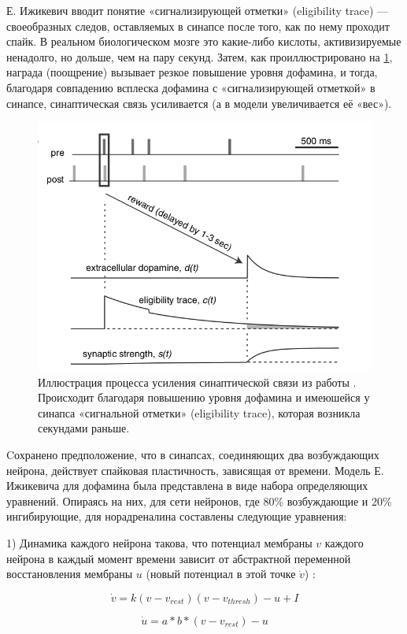 Е. Ижикевич вводит понятие «сигнализирующей отметки» (eligibility trace) — своеобразных следов, оставляемых в синапсе после того, как по нему проходит спайк. В реальном биологическом мозге это какие-либо кислоты, активизируемые ненадолго, но дольше, чем на пару секунд. Затем, как проиллюстрировано на \ref{fig:izhikevich}, награда (поощрение) вызывает резкое повышение уровня дофамина, и тогда, благодаря совпадению всплеска дофамина с «сигнализирующей отметкой» в синапсе, синаптическая связь усиливается (а в модели увеличивается её «вес»).


\begin{figure}
	\centering
	\includegraphics[width=0.5\linewidth]{figures/izhikevich}
	\caption{Иллюстрация процесса усиления синаптической связи из работы \cite{izhikevich}. Происходит благодаря повышению уровня дофамина и имеюшейся у синапса «сигнальной отметки» (eligibility trace), которая возникла секундами раньше.}
	\label{fig:izhikevich}
\end{figure}


Cохранено предположение, что в синапсах, соединяющих два возбуждающих нейрона, действует спайковая пластичность, зависящая от времени. Модель Е. Ижикевича для дофамина была представлена в виде набора определяющих уравнений. Опираясь на них, для сети нейронов, где 80\% возбуждающие и 20\% ингибирующие, для норадреналина составлены следующие уравнения:


1) Динамика каждого нейрона такова, что потенциал мембраны $v$ каждого нейрона в каждый момент времени зависит от абстрактной переменной восстановления мембраны $u$ (новый потенциал в этой точке $\dot{v}$) \cite{tactile}:

\begin{equation} \label{eq:1}
\dot{v} = k (v - v_{rest})(v - v_{thresh}) - u + I
\end{equation}


\begin{equation} \label{eq:2}
\dot{u}=  a*b*(v - v_{rest}) - u
\end{equation}


